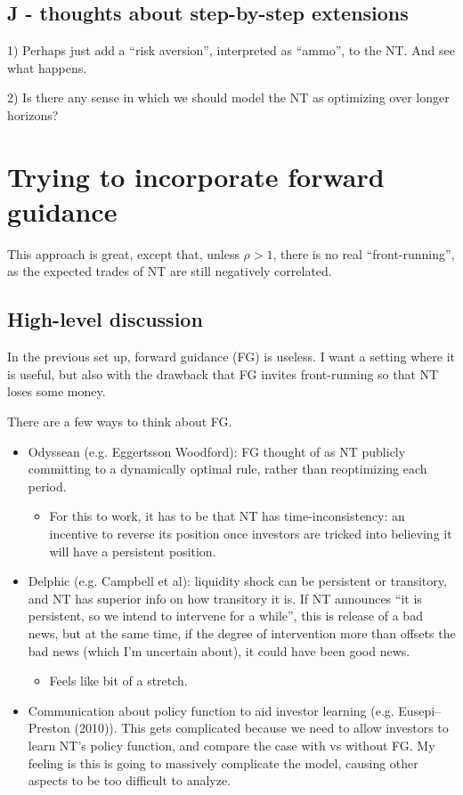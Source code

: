 \documentclass[12pt]{article}
\begin{document}
\subsection{J - thoughts about step-by-step extensions}

1) Perhaps just add a ``risk aversion'', interpreted as ``ammo'', to the NT. And see what happens. 

2) Is there any sense in which we should model the NT as optimizing over longer horizons? 

\newpage

\section{Trying to incorporate forward guidance}

This approach is great, except that, unless $\rho > 1$, there is no real ``front-running'', as the expected trades of NT are still negatively correlated. 

\subsection{High-level discussion}
In the previous set up, forward guidance (FG) is useless. I want a setting where it is useful, but also with the drawback that FG invites front-running so that NT loses some money. 

There are a few ways to think about FG. 

\begin{itemize}
    \item Odyssean (e.g. Eggertsson Woodford): FG thought of as NT publicly committing to a dynamically optimal rule, rather than reoptimizing each period. 
    \begin{itemize}
        \item For this to work, it has to be that NT has time-inconsistency: an incentive to reverse its position once investors are tricked into believing it will have a persistent position. 
    \end{itemize}

    \item Delphic (e.g. Campbell et al): liquidity shock can be persistent or transitory, and NT has superior info on how transitory it is. If NT announces ``it is persistent, so we intend to intervene for a while'', this is release of a bad news, but at the same time, if the degree of intervention more than offsets the bad news (which I'm uncertain about), it could have been good news. 
    \begin{itemize}
        \item Feels like bit of a stretch. 
    \end{itemize}

    \item Communication about policy function to aid investor learning (e.g. Eusepi–Preston (2010)). This gets complicated because we need to allow investors to learn NT's policy function, and compare the case with vs without FG. My feeling is this is going to massively complicate the model, causing other aspects to be too difficult to analyze. 
\end{itemize}
\end{document}
